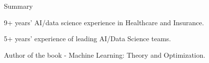 \documentclass{resume} %
\begin{document}

\begin{rSection}{Summary} 

\begin{rSubsection}{}{}{}{}
\item 9+ years' AI/data science experience in Healthcare and Insurance.
\item 5+ years' experience of leading AI/Data Science teams.
\item Author of the book - Machine Learning: Theory and Optimization.
\end{rSubsection}


\end{rSection}

\end{document}
